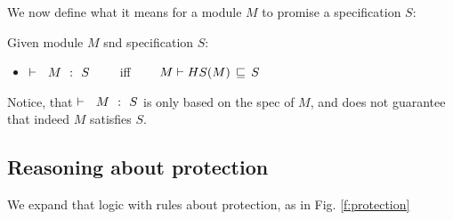 We now define what it means for a module $M$ to promise a specification $S$:

\begin{definition}
Given module $M$ snd specification $S$:

\begin{itemize}
\item ${\vdash \ \ M\ \ \mathbf{:}\ \ S}$ \ \ \ \  iff \ \ \ \  $M \vdash HS(M)\, \sqsubseteq\, S$
\end{itemize}
\end{definition}

Notice, that ${\vdash \ \ M\ \ \mathbf{:}\ \ S}$ is only based on the spec of $M$, and does not guarantee that indeed $M$ satisfies $S$.

% 
%
%
%
 


\subsection{Reasoning about protection}
We expand that logic with rules about protection, as in Fig. \ref{f:protection}

